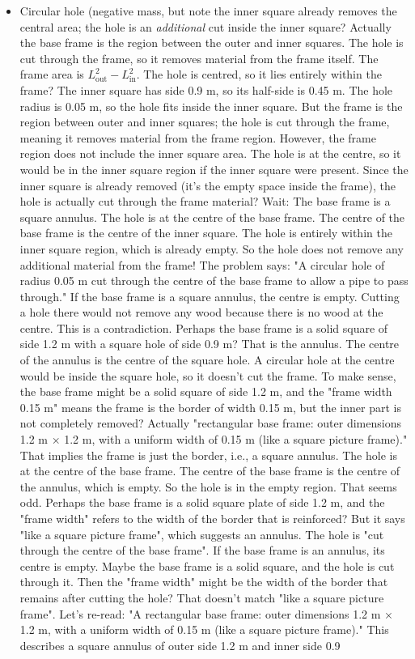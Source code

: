 \documentclass[11pt]{article}
\begin{document}
\begin{exoresolu}
\begin{enumerate}
\begin{itemize}
        \item Circular hole (negative mass, but note the inner square already removes the central area; the hole is an \emph{additional} cut inside the inner square? Actually the base frame is the region between the outer and inner squares. The hole is cut through the frame, so it removes material from the frame itself. The frame area is $L_{\text{out}}^2 - L_{\text{in}}^2$. The hole is centred, so it lies entirely within the frame? The inner square has side 0.9 m, so its half-side is 0.45 m. The hole radius is 0.05 m, so the hole fits inside the inner square. But the frame is the region between outer and inner squares; the hole is cut through the frame, meaning it removes material from the frame region. However, the frame region does not include the inner square area. The hole is at the centre, so it would be in the inner square region if the inner square were present. Since the inner square is already removed (it's the empty space inside the frame), the hole is actually cut through the frame material? Wait: The base frame is a square annulus. The hole is at the centre of the base frame. The centre of the base frame is the centre of the inner square. The hole is entirely within the inner square region, which is already empty. So the hole does not remove any additional material from the frame! The problem says: "A circular hole of radius 0.05 m cut through the centre of the base frame to allow a pipe to pass through." If the base frame is a square annulus, the centre is empty. Cutting a hole there would not remove any wood because there is no wood at the centre. This is a contradiction. Perhaps the base frame is a solid square of side 1.2 m with a square hole of side 0.9 m? That is the annulus. The centre of the annulus is the centre of the square hole. A circular hole at the centre would be inside the square hole, so it doesn't cut the frame. To make sense, the base frame might be a solid square of side 1.2 m, and the "frame width 0.15 m" means the frame is the border of width 0.15 m, but the inner part is not completely removed? Actually "rectangular base frame: outer dimensions 1.2 m × 1.2 m, with a uniform width of 0.15 m (like a square picture frame)." That implies the frame is just the border, i.e., a square annulus. The hole is at the centre of the base frame. The centre of the base frame is the centre of the annulus, which is empty. So the hole is in the empty region. That seems odd. Perhaps the base frame is a solid square plate of side 1.2 m, and the "frame width" refers to the width of the border that is reinforced? But it says "like a square picture frame", which suggests an annulus. The hole is "cut through the centre of the base frame". If the base frame is an annulus, its centre is empty. Maybe the base frame is a solid square, and the hole is cut through it. Then the "frame width" might be the width of the border that remains after cutting the hole? That doesn't match "like a square picture frame". Let's re-read: "A rectangular base frame: outer dimensions 1.2 m × 1.2 m, with a uniform width of 0.15 m (like a square picture frame)." This describes a square annulus of outer side 1.2 m and inner side 0.9 
\end{itemize}
\end{enumerate}
\end{exoresolu}
\end{document}
